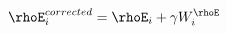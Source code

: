 \documentclass{minimal}
\begin{document}
 \begin{align*}
\rhoE_i^{corrected} = \rhoE_i + \gamma W^{\rhoE}_i
 \end{align*}
 
\end{document}
